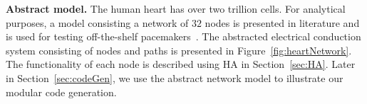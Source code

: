 \noindent \textbf{Abstract model.}
The human heart has over two trillion cells. For analytical purposes, a
model consisting  a network of  $32$ nodes is presented in literature
and is used for testing off-the-shelf pacemakers~\cite{chen14,zhihao12}.
The abstracted electrical conduction system consisting  of 
nodes and paths is presented in Figure~\ref{fig:heartNetwork}.
The functionality of each node is described using \acf{HA} in Section~\ref{sec:HA}.
Later in Section~\ref{sec:codeGen}, we use the abstract network model 
to illustrate our modular code generation.

 
